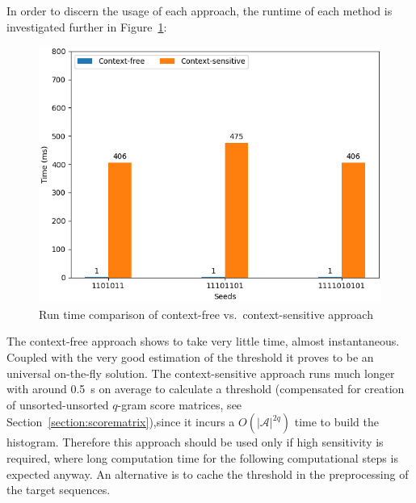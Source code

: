 \documentclass[twoside,a4paper,bsc]{master}
\newcommand{\Qgram}[1]{\(#1\)-gram}
\newcommand{\Alpha}[0]{\mathcal{A}}
\begin{document}
In order to discern the usage of each approach, the runtime
of each method is investigated further in Figure~\ref{fig:sens_runtime}:
\begin{figure}
\centering
\includegraphics[scale=0.6]{graphics/speed_threshold.png}
\caption{Run time comparison of context-free vs.\ context-sensitive
approach}
\label{fig:sens_runtime}
\end{figure}
The context-free approach shows to take very little time, almost
instantaneous.
Coupled with the very good estimation of the threshold it proves to be an
universal on-the-fly solution. The context-sensitive approach runs much longer
with around 0.5~s on average to calculate a threshold (compensated for
creation of unsorted-unsorted \Qgram{q} score matrices, see
Section~\ref{section:scorematrix}),since it incurs a \(O(|\Alpha|^{2q})\)
time to build the histogram. Therefore this approach should be used only if
high sensitivity is required, where long computation time for the following
computational steps is expected anyway. An alternative is to cache the
threshold in the preprocessing of the target sequences.
\end{document}
